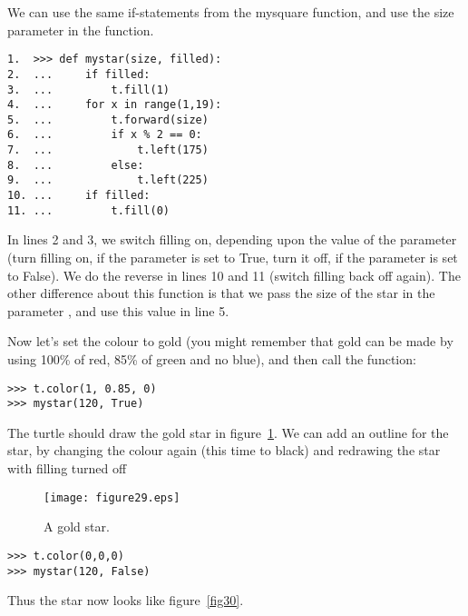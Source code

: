 We can use the same if-statements from the mysquare function, and use the size parameter in the  function.

\begin{listing}
\begin{verbatim}
1.  >>> def mystar(size, filled):
2.  ...     if filled:
3.  ...         t.fill(1)
4.  ...     for x in range(1,19):
5.  ...         t.forward(size)
6.  ...         if x % 2 == 0:
7.  ...             t.left(175)
8.  ...         else:
9.  ...             t.left(225)
10. ...     if filled:
11. ...         t.fill(0)
\end{verbatim}
\end{listing}

In lines 2 and 3, we switch filling on, depending upon the value of the parameter  (turn filling on, if the parameter is set to True, turn it off, if the parameter is set to False).  We do the reverse in lines 10 and 11 (switch filling back off again).  The other difference about this function is that we pass the size of the star in the parameter , and use this value in line 5.
\par
Now let's set the colour to gold (you might remember that gold can be made by using 100\% of red, 85\% of green and no blue), and then call the function:

\begin{listing}
\begin{verbatim}
>>> t.color(1, 0.85, 0)
>>> mystar(120, True)
\end{verbatim}
\end{listing}

\noindent
The turtle should draw the gold star in figure~\ref{fig29}. We can add an outline for the star, by changing the colour again (this time to black) and redrawing the star with filling turned off

\begin{figure}
\begin{center}
\texttt{[image: figure29.eps]}
\end{center}
\caption{A gold star.}\label{fig29}
\end{figure}

\begin{listing}
\begin{verbatim}
>>> t.color(0,0,0)
>>> mystar(120, False)
\end{verbatim}
\end{listing}

\noindent
Thus the star now looks like figure~\ref{fig30}.

